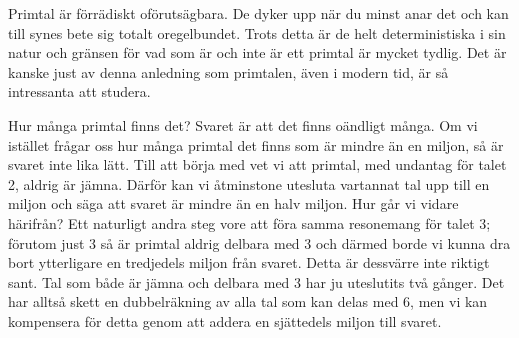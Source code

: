 
Primtal är förrädiskt oförutsägbara.
De dyker upp när du minst anar det och kan till synes bete sig totalt oregelbundet.
Trots detta är de helt deterministiska i sin natur och gränsen för vad som är och inte är ett primtal är mycket tydlig.
Det är kanske just av denna anledning som primtalen, även i modern tid, är så intressanta att studera.


Hur många primtal finns det? Svaret är att det finns oändligt många.
Om vi istället frågar oss hur många primtal det finns som är mindre än en miljon, så är svaret inte lika lätt.
Till att börja med vet vi att primtal, med undantag för talet 2, aldrig är jämna.
Därför kan vi åtminstone utesluta vartannat tal upp till en miljon och säga att svaret är mindre än en halv miljon.
Hur går vi vidare härifrån?
Ett naturligt andra steg vore att föra samma resonemang för talet 3;
förutom just 3 så är primtal aldrig delbara med 3 och därmed borde vi kunna dra bort ytterligare en tredjedels miljon från svaret.
Detta är dessvärre inte riktigt sant.
Tal som både är jämna och delbara med 3 har ju uteslutits två gånger.
Det har alltså skett en dubbelräkning av alla tal som kan delas med 6,
men vi kan kompensera för detta genom att addera en sjättedels miljon till svaret.


